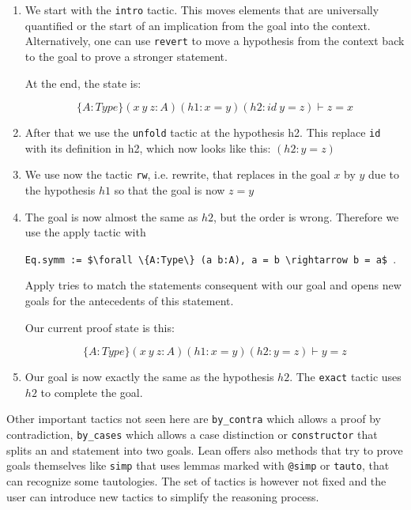 \begin{enumerate}
    \item We start with the \lstinline|intro| tactic. This moves elements that are universally quantified or the start of an implication from the goal into the context. Alternatively, one can use \lstinline|revert| to move a hypothesis from the context back to the goal to prove a stronger statement.
    
    At the end, the state is: 

    \[ \{A:Type\} (x\ y\ z: A) (h1: x = y) (h2: id\ y = z)\vdash z = x\]

    \item After that we use the \lstinline|unfold| tactic at the hypothesis h2. This replace \lstinline|id| with its definition in h2, which now looks like this: $(h2: y = z)$
    
    \item We use now the tactic \lstinline|rw|, i.e. rewrite, that replaces in the goal $x$ by $y$ due to the hypothesis $h1$ so that the goal is now $z = y$
    \item The goal is now almost the same as $h2$, but the order is wrong. Therefore we use the apply tactic with
    
    \lstinline|Eq.symm := $\forall \{A:Type\} (a b:A), a = b \rightarrow b = a$ |. 

    Apply tries to match the statements consequent with our goal and opens new goals for the antecedents of this statement.

    Our current proof state is this:

    \[ \{A:Type\} (x\ y\ z: A) (h1: x = y) (h2: y = z)\vdash y = z\]

    \item Our goal is now exactly the same as the hypothesis $h2$. The \lstinline|exact| tactic uses $h2$ to complete the goal.
\end{enumerate}

Other important tactics not seen here are \lstinline|by_contra| which allows a proof by contradiction, \lstinline|by_cases| which allows a case distinction or \lstinline|constructor| that splits an and statement into two goals. Lean offers also methods that try to prove goals themselves like \lstinline|simp| that uses lemmas marked with \lstinline|@simp| or \lstinline|tauto|, that can recognize some tautologies. The set of tactics is however not fixed and the user can introduce new tactics to simplify the reasoning process.


